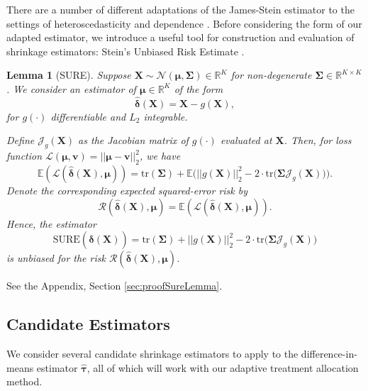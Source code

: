 \documentclass{article}
\newcommand{\bsX}{\boldsymbol X}
\newcommand{\bsmu}{\boldsymbol \mu}
\newcommand{\bsSigma}{\boldsymbol \Sigma}
\newcommand{\hbstau}{\boldsymbol{\hat \tau}}
\newcommand{\bsSig}{\boldsymbol  \Sigma}
\newtheorem{lemma}{Lemma}
\newenvironment{proof*}
  {\renewcommand{\qedsymbol}{}\proof}
  {\endproof}
\def\e{\mathbb{E}}
\newcommand{\Tr}{\text{tr}}
\newcommand{\bsdelt}{\boldsymbol{\hat \delta}}
\begin{document}
There are a number of different adaptations of the James-Stein estimator to the settings of heteroscedasticity and dependence  \citep[see e.g.][]{xie2012sure}. Before considering the form of our adapted estimator, we introduce a useful tool for construction and evaluation of shrinkage estimators: Stein's Unbiased Risk Estimate \citep{stein1981estimation}. %

\begin{lemma}[SURE]\label{lemma:sure}
Suppose $\bsX \sim \mathcal{N}\left(\bsmu, \boldsymbol \Sigma\right) \in \mathbb{R}^K$ for non-degenerate $\bsSigma \in \mathbb{R}^{K \times K}$. We consider an estimator of $\bsmu \in \mathbb{R}^K$ of the form 
\[ \bsdelt(\bsX) = \bsX - g(\bsX), \]
for $g(\cdot)$ differentiable and $L_2$ integrable. 

Define $\mathcal{J}_{g}( \bsX )$ as the Jacobian matrix of $g(\cdot)$ evaluated at $\bsX$. Then, for loss function $\mathcal L(\bsmu, \boldsymbol v) =   || \bsmu - \boldsymbol v ||_2^2 $, we have 
\begin{equation}\label{eq:risk}
\e \left( \mathcal{L}\left( \bsdelt(\bsX), \bsmu \right) \right) = \Tr(\bsSigma ) + \e \bigg(|| g(\bsX)||_2^2 - 2 \cdot \Tr \big( \bsSig \mathcal{J}_{g}( \bsX )\big)  \bigg).
\end{equation}
Denote the corresponding expected squared-error risk by
\[ \mathcal{R}(\bsdelt(\bsX),\bsmu) = \e \left(\mathcal{L}(\bsdelt(\bsX),\bsmu)\right). \]
Hence, the estimator 
\begin{equation} \label{eq:SURE}
\text{SURE}(\bsdelt(\bsX)) = \Tr(\bsSigma ) + || g(\bsX)||_2^2 - 2 \cdot \Tr \big( \bsSig \mathcal{J}_{g}( \bsX )\big)
\end{equation} 
is unbiased for the risk $\mathcal{R} \left(\bsdelt(\bsX), \bsmu \right)$. 
\end{lemma}

\begin{proof*}
See the Appendix, Section \ref{sec:proofSureLemma}. 
\end{proof*}



\subsection{Candidate Estimators}

We consider several candidate shrinkage estimators to apply to the difference-in-means estimator $\hbstau$, all of which will work with our adaptive treatment allocation method. 
\end{document}
